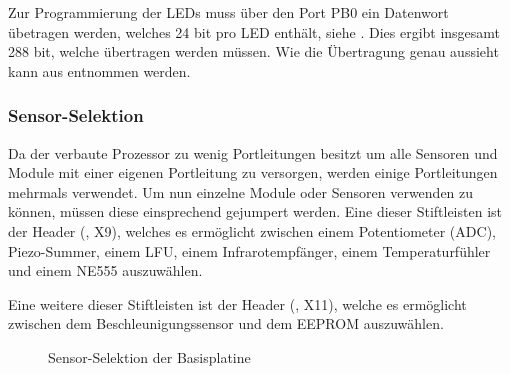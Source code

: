 Zur Programmierung der LEDs muss über den Port PB0 ein Datenwort übetragen werden, welches 24 bit pro LED enthält, siehe . Dies ergibt insgesamt 288 bit, welche übertragen werden müssen. Wie die Übertragung genau aussieht kann aus  entnommen werden.


\subsubsection{Sensor-Selektion}
Da der verbaute Prozessor zu wenig Portleitungen besitzt um alle Sensoren und Module mit einer eigenen Portleitung zu versorgen, werden einige Portleitungen mehrmals verwendet. Um nun einzelne Module oder Sensoren verwenden zu können, müssen diese einsprechend gejumpert werden. Eine dieser Stiftleisten ist der Header (, X9), welches es ermöglicht zwischen einem Potentiometer (\gls{ADC}), Piezo-Summer, einem LFU, einem Infrarotempfänger, einem Temperaturfühler und einem NE555 auszuwählen.

Eine weitere dieser Stiftleisten ist der Header (, X11), welche es ermöglicht zwischen dem Beschleunigungssensor und dem EEPROM auszuwählen.

\begin{figure}[htb]
    \centering
    \qquad
    \qquad
    \caption[Sensor-Selektion der Basisplatine]{Sensor-Selektion der \gls{Basisplatine}}
    \label{fig:basisplatine-ssel}
\end{figure}

